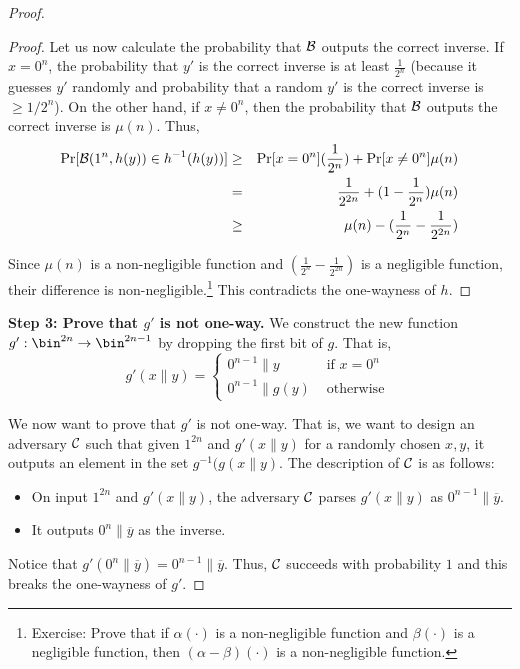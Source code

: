 \documentclass[12pt]{tufte-book}
\begin{document}
\begin{proof}
\begin{proof}
Let us now calculate the probability that $\mathcal{B}$ outputs the correct inverse. If $x = 0^n$, the probability that $y'$ is the correct inverse is at least $\frac{1}{2^n}$ (because it guesses $y'$ randomly and probability that a random $y'$ is the correct inverse is $\geq 1/2^n$). On the other hand, if $x \neq 0^n$, then the probability that $\mathcal{B}$ outputs the correct inverse is $\mu(n)$. Thus,
\begin{eqnarray*}
\Pr[\mathcal{B}(1^n,h(y)) \in h^{-1}(h(y))] & \geq & \Pr[x = 0^n](\frac{1}{2^n}) + \Pr[x \neq 0^n]\mu(n)\\
& = & \frac{1}{2^{2n}} + (1 - \frac{1}{2^n}) \mu(n) \\
& \geq & \mu(n) - (\frac{1}{2^{n}} - \frac{1}{2^{2n}})
\end{eqnarray*}

Since $\mu(n)$ is a non-negligible function and $(\frac{1}{2^{n}} - \frac{1}{2^{2n}})$ is a negligible function, their difference is non-negligible.\footnote{Exercise: Prove that if $\alpha(\cdot)$ is a non-negligible function and $\beta(\cdot)$ is a negligible function, then $(\alpha - \beta)(\cdot)$ is a non-negligible function.} This contradicts the one-wayness of $h$.

\end{proof} 


\noindent\textbf{Step 3: Prove that $g'$ is not one-way.} 
We construct the new function $g': \bin^{2n} \rightarrow \bin^{2n-1}$ by dropping the first bit of $g$. That is,
$$
g'(x\|y) = \begin{cases}
 0^{n-1}\|y &\text{    if } x = 0^n\\
0^{n-1}\|g(y) &\text{    otherwise }
\end{cases}
$$

We now want to prove that $g'$ is not one-way. That is, we want to design an adversary $\mathcal{C}$ such that given $1^{2n}$ and $g'(x \| y)$ for a randomly chosen $x,y$, it outputs an element in the set $g^{-1}(g(x \| y)$. The description of $\mathcal{C}$ is as follows:

\begin{itemize}
\item On input $1^{2n}$ and $g'(x \| y)$, the adversary $\mathcal{C}$ parses $g'(x \| y)$ as $0^{n-1} \| \overline{y}$.
\item It outputs $0^{n} \| \overline{y}$ as the inverse.
\end{itemize}
Notice that $g'(0^{n} \| \overline{y}) = 0^{n-1} \| \overline{y}$. Thus, $\mathcal{C}$ succeeds with probability $1$ and this breaks the one-wayness of $g'$.

\end{proof}
\end{document}
